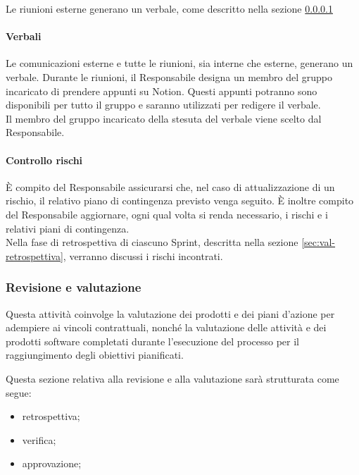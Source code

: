     Le riunioni esterne generano un verbale, come descritto nella sezione \ref{sec:exe-verbali}

    \paragraph{Verbali} \label{sec:exe-verbali}
    Le comunicazioni esterne e tutte le riunioni, sia interne che esterne, generano un verbale. Durante le riunioni, il Responsabile designa un membro del gruppo incaricato di prendere appunti su Notion. Questi appunti potranno sono disponibili per tutto il gruppo e saranno utilizzati per redigere il verbale. \\
    Il membro del gruppo incaricato della stesuta del verbale viene scelto dal Responsabile.



    \paragraph{Controllo rischi}
    È compito del Responsabile assicurarsi che, nel caso di attualizzazione di un rischio, il relativo piano di contingenza previsto venga seguito.
    È inoltre compito del Responsabile aggiornare, ogni qual volta si renda necessario, i rischi e i relativi piani di contingenza.\\
    Nella fase di retrospettiva di ciascuno Sprint, descritta nella sezione \ref{sec:val-retrospettiva}, verranno discussi i rischi incontrati.

    \subsubsection{Revisione e valutazione}\label{sec:review}
    Questa attività coinvolge la valutazione dei prodotti e dei piani d'azione per adempiere ai vincoli contrattuali, nonché la valutazione delle attività e dei prodotti software completati durante l'esecuzione del processo per il raggiungimento degli obiettivi pianificati.

        Questa sezione relativa alla revisione e alla valutazione sarà strutturata come segue:
        \begin{itemize}
            \item retrospettiva;
            \item verifica;
            \item approvazione;
        \end{itemize}

